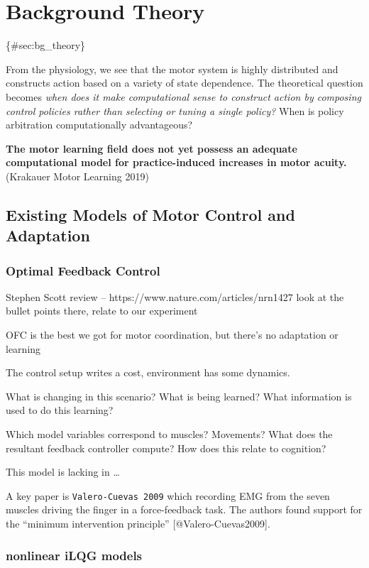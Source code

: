 \section{Background Theory}\label{background-theory}

\{\#sec:bg\_theory\}

From the physiology, we see that the motor system is highly distributed
and constructs action based on a variety of state dependence. The
theoretical question becomes \emph{when does it make computational sense
to construct action by composing control policies rather than selecting
or tuning a single policy?} When is policy arbitration computationally
advantageous?

\textbf{The motor learning field does not yet possess an adequate
computational model for practice-induced increases in motor acuity.}
(Krakauer Motor Learning 2019)

\subsection{Existing Models of Motor Control and
Adaptation}\label{existing-models-of-motor-control-and-adaptation}

\subsubsection{Optimal Feedback Control}\label{optimal-feedback-control}

Stephen Scott review -- https://www.nature.com/articles/nrn1427 look at
the bullet points there, relate to our experiment

OFC is the best we got for motor coordination, but there's no adaptation
or learning

The control setup writes a cost, environment has some dynamics.

What is changing in this scenario? What is being learned? What
information is used to do this learning?

Which model variables correspond to muscles? Movements? What does the
resultant feedback controller compute? How does this relate to
cognition?

This model is lacking in \ldots{}

A key paper is \texttt{Valero-Cuevas\ 2009} which recording EMG from the
seven muscles driving the finger in a force-feedback task. The authors
found support for the ``minimum intervention principle''
{[}@Valero-Cuevas2009{]}.

\subsubsection{nonlinear iLQG models}\label{nonlinear-ilqg-models}

